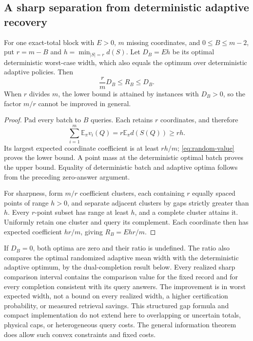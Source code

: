 \subsection{A sharp separation from deterministic adaptive recovery}
\begin{proposition}
\label{prop:random-gap}
For one exact-total block with $E>0$, $m$ missing coordinates, and
$0\leq B\leq m-2$, put $r=m-B$ and
$h=\min_{|S|=r}d(S)$. Let $D_B=Eh$ be its optimal deterministic
worst-case width, which also equals the optimum over deterministic
adaptive policies. Then
\begin{equation}
 \frac{r}{m}D_B\leq R_B\leq D_B.
 \label{eq:random-gap}
\end{equation}
When $r$ divides $m$, the lower bound is attained by instances with
$D_B>0$, so the factor $m/r$ cannot be improved in general.
\end{proposition}
\begin{proof}
Pad every batch to $B$ queries. Each retains $r$ coordinates, and therefore
\[
 \sum_{i=1}^m\mathbb E_\pi v_i(Q)
 =r\mathbb E_\pi d(S(Q))\geq rh.
\]
Its largest expected coordinate coefficient is at least $rh/m$;
\eqref{eq:random-value} proves the lower bound. A point mass at the
deterministic optimal batch proves the upper bound. Equality of
deterministic batch and adaptive optima follows from the preceding
zero-answer argument.

For sharpness, form $m/r$ coefficient clusters, each containing $r$
equally spaced points of range $h>0$, and separate adjacent clusters
by gaps strictly greater than $h$. Every $r$-point subset has range
at least $h$, and a complete cluster attains it. Uniformly retain one
cluster and query its complement. Each coordinate then has expected
coefficient $hr/m$, giving $R_B=Ehr/m$.
\end{proof}

If $D_B=0$, both optima are zero and their ratio is undefined.
The ratio also compares the optimal randomized adaptive mean width with
the deterministic adaptive optimum, by the dual-completion result below. Every realized sharp comparison interval
contains the comparison value for the fixed record and for every completion
consistent with its query answers. The improvement is in worst expected width, not a bound
on every realized width, a higher certification probability, or measured
retrieval savings. This structured gap formula and compact implementation do not extend here
to overlapping or uncertain totals, physical caps, or heterogeneous query
costs. The general information theorem does allow such convex constraints
and fixed costs.



